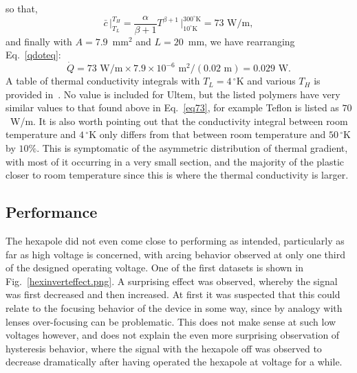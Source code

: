 so that,
\begin{equation}
\bar{c}\,\bigg|_{T_L}^{T_H} = \frac{\alpha}{\beta+1} T^{\beta+1}\,\bigg|_{10^\circ\text{K}}^{300^\circ\text{K}} = 73\text{ W/m}\label{eq73},
\end{equation}
and finally with $A=7.9$~mm$^2$ and $L=20$~mm, we have rearranging Eq.~\ref{qdoteq}:
\begin{equation}
\dot{Q} = 73\text{ W/m}\times7.9\times10^{-6}\text{ m}^2/ (0.02\text{ m})=0.029\text{ W}.
\end{equation}
A table of thermal conductivity integrals with $T_L=4\,^\circ$K and various $T_H$ is provided in~\citep[App.~A2.1]{Ekin2006}. No value is included for Ultem, but the listed polymers have very similar values to that found above in Eq.~\ref{eq73}, for example Teflon is listed as $70$~W/m.
It is also worth pointing out that the conductivity integral between room temperature and $4\,^\circ$K only differs from that between room temperature and $50\,^\circ$K by $10\%$. 
This is symptomatic of the asymmetric distribution of thermal gradient, with most of it occurring in a very small section, and the majority of the plastic closer to room temperature since this is where the thermal conductivity is larger.

\subsection{Performance}

The hexapole did not even come close to performing as intended, particularly as far as high voltage is concerned, with arcing behavior observed at only one third of the designed operating voltage.
One of the first datasets is shown in Fig.~\ref{hexinverteffect.png}.
A surprising effect was observed, whereby the signal was first decreased and then increased.
At first it was suspected that this could relate to the focusing behavior of the device in some way, since by analogy with lenses over-focusing can be problematic.
This does not make sense at such low voltages however, and does not explain the even more surprising observation of hysteresis behavior, where the signal with the hexapole off was observed to decrease dramatically after having operated the hexapole at voltage for a while.


